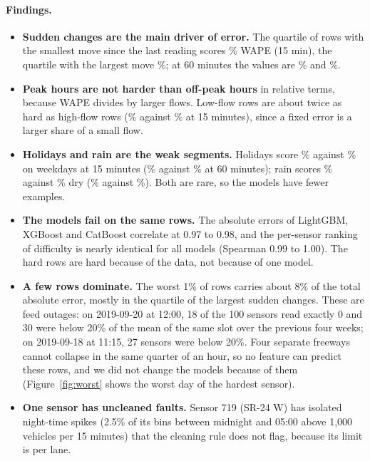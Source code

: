 \documentclass[11pt,a4paper]{article}
\begin{document}
\paragraph{Findings.}
\begin{itemize}
\item \textbf{Sudden changes are the main driver of error.} The quartile of rows with the smallest move since the last reading scores \chgSteadyFifteen\% WAPE (15 min), the quartile with the largest move \chgSuddenFifteen\%; at 60 minutes the values are \chgSteadySixty\% and \chgSuddenSixty\%.
\item \textbf{Peak hours are not harder than off-peak hours} in relative terms, because WAPE divides by larger flows. Low-flow rows are about twice as hard as high-flow rows (\lowFlowFifteen\% against \highFlowFifteen\% at 15 minutes), since a fixed error is a larger share of a small flow.
\item \textbf{Holidays and rain are the weak segments.} Holidays score \holidayFifteen\% against \weekdayFifteen\% on weekdays at 15 minutes (\holidaySixty\% against \weekdaySixty\% at 60 minutes); rain scores \rainFifteen\% against \dryFifteen\% dry (\rainSixty\% against \drySixty\%). Both are rare, so the models have fewer examples.
\item \textbf{The models fail on the same rows.} The absolute errors of LightGBM, XGBoost and CatBoost correlate at 0.97 to 0.98, and the per-sensor ranking of difficulty is nearly identical for all models (Spearman 0.99 to 1.00). The hard rows are hard because of the data, not because of one model.
\item \textbf{A few rows dominate.} The worst 1\% of rows carries about 8\% of the total absolute error, mostly in the quartile of the largest sudden changes. These are feed outages: on 2019-09-20 at 12:00, 18 of the 100 sensors read exactly 0 and 30 were below 20\% of the mean of the same slot over the previous four weeks; on 2019-09-18 at 11:15, 27 sensors were
below 20\%. Four separate freeways cannot collapse in the same quarter of an hour, so no feature can predict these rows, and we did not change the models because of them (Figure~\ref{fig:worst} shows the worst day of the hardest sensor).
\item \textbf{One sensor has uncleaned faults.} Sensor 719 (SR-24 W) has isolated night-time spikes (2.5\% of its bins between midnight and 05:00 above 1{,}000 vehicles per 15 minutes) that the cleaning rule does not flag, because its limit is per lane.
\end{itemize}
\end{document}
